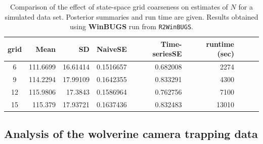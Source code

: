 {{\begin{table}
\centering
\caption{
Comparison of the 
effect of state-space grid coarseness on estimates of $N$ for a
simulated data set. Posterior
summaries and run time are given. Results obtained  using 
{\bf WinBUGS} run from {\tt R2WinBUGS}. 
}
\begin{tabular}{crrrrrrrc} \hline \hline
grid  & Mean & SD &   NaiveSE & Time-seriesSE &  runtime (sec) \\ \hline
6     &    111.6699& 16.61414& 0.1516657 &  0.682008 &     2274 \\
9     &    114.2294& 17.99109& 0.1642355 &  0.833291 &    4300 \\
12    &    115.9806& 17.3843 & 0.1586964 &  0.762756 &    7100 \\
15    &    115.379 & 17.93721& 0.1637436 &  0.832483 &   13010 \\
\end{tabular}
\label{scr0.tab.discrete}
\end{table}

\subsection{Analysis of the wolverine camera trapping data}


}}
